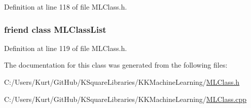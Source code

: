 Definition at line 118 of file M\+L\+Class.\+h.

\subsubsection[{\texorpdfstring{M\+L\+Class\+List}{MLClassList}}]{\setlength{\rightskip}{0pt plus 5cm}friend class {\bf M\+L\+Class\+List}\hspace{0.3cm}{\ttfamily [friend]}}\hypertarget{class_k_k_m_l_l_1_1_m_l_class_aebbe3bcd525e27070e7cc765528293b5}{}\label{class_k_k_m_l_l_1_1_m_l_class_aebbe3bcd525e27070e7cc765528293b5}


Definition at line 119 of file M\+L\+Class.\+h.



The documentation for this class was generated from the following files\+:\begin{DoxyCompactItemize}
\item 
C\+:/\+Users/\+Kurt/\+Git\+Hub/\+K\+Square\+Libraries/\+K\+K\+Machine\+Learning/\hyperlink{_m_l_class_8h}{M\+L\+Class.\+h}\item 
C\+:/\+Users/\+Kurt/\+Git\+Hub/\+K\+Square\+Libraries/\+K\+K\+Machine\+Learning/\hyperlink{_m_l_class_8cpp}{M\+L\+Class.\+cpp}\end{DoxyCompactItemize}
